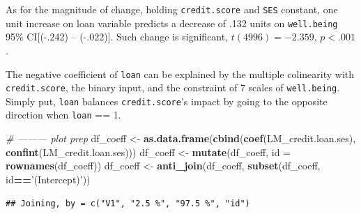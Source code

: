 \documentclass[]{article}
\newenvironment{Shaded}{\begin{snugshade}}{\end{snugshade}}
\newcommand{\CommentTok}[1]{\textcolor[rgb]{0.56,0.35,0.01}{\textit{#1}}}
\newcommand{\DataTypeTok}[1]{\textcolor[rgb]{0.13,0.29,0.53}{#1}}
\newcommand{\KeywordTok}[1]{\textcolor[rgb]{0.13,0.29,0.53}{\textbf{#1}}}
\newcommand{\NormalTok}[1]{#1}
\newcommand{\OperatorTok}[1]{\textcolor[rgb]{0.81,0.36,0.00}{\textbf{#1}}}
\newcommand{\StringTok}[1]{\textcolor[rgb]{0.31,0.60,0.02}{#1}}
\begin{document}
As for the magnitude of change, holding \texttt{credit.score} and
\texttt{SES} constant, one unit increase on loan variable predicts a
decrease of .132 units on \texttt{well.being} 95\% CI{[}(-.242) --
(-.022){]}. Such change is significant, \(t(4996) = -2.359\),
\(p < .001\).

The negative coefficient of \texttt{loan} can be explained by the
multiple colinearity with \texttt{credit.score}, the binary input, and
the constraint of 7 scales of \texttt{well.being}. Simply put,
\texttt{loan} balances \texttt{credit.score}'s impact by going to the
opposite direction when \texttt{loan} == 1.

\begin{Shaded}
\begin{Highlighting}[]
\CommentTok{# --------- plot prep}
\NormalTok{df_coeff <-}\StringTok{ }\KeywordTok{as.data.frame}\NormalTok{(}\KeywordTok{cbind}\NormalTok{(}\KeywordTok{coef}\NormalTok{(LM_credit.loan.ses), }\KeywordTok{confint}\NormalTok{(LM_credit.loan.ses)))}
\NormalTok{df_coeff <-}\StringTok{ }\KeywordTok{mutate}\NormalTok{(df_coeff, }\DataTypeTok{id =} \KeywordTok{rownames}\NormalTok{(df_coeff))}
\NormalTok{df_coeff <-}\StringTok{ }\KeywordTok{anti_join}\NormalTok{(df_coeff, }\KeywordTok{subset}\NormalTok{(df_coeff, id}\OperatorTok{==}\StringTok{'(Intercept)'}\NormalTok{))}
\end{Highlighting}
\end{Shaded}

\begin{verbatim}
## Joining, by = c("V1", "2.5 %", "97.5 %", "id")
\end{verbatim}
\end{document}
